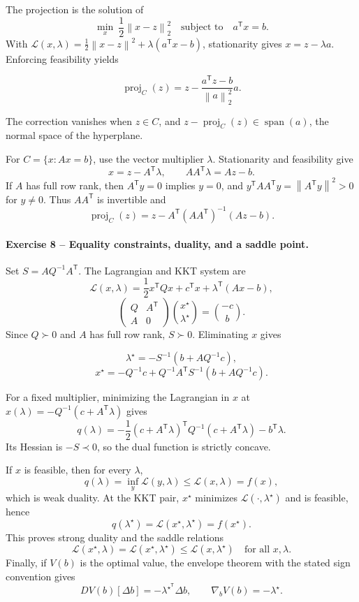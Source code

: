 \documentclass[10pt]{article}
\newcommand{\trans}{^{\mathsf T}}
\newcommand{\norm}[1]{\left\lVert#1\right\rVert}
\newcommand{\proj}{\operatorname{proj}}
\begin{document}
The projection is the solution of
\[
\min_x\ \frac12\norm{x-z}_2^2
\quad\text{subject to}\quad a\trans x=b.
\]
With
\(\mathcal L(x,\lambda)=\frac12\norm{x-z}^2+\lambda(a\trans x-b)\),
stationarity gives \(x=z-\lambda a\). Enforcing feasibility yields
\begin{resultbox}
\[
\proj_C(z)=z-\frac{a\trans z-b}{\norm a_2^2}a.
\]
\end{resultbox}
The correction vanishes when \(z\in C\), and
\(z-\proj_C(z)\in\operatorname{span}(a)\), the normal space of the hyperplane.

For \(C=\{x:Ax=b\}\), use the vector multiplier \(\lambda\). Stationarity and
feasibility give
\[
x=z-A\trans\lambda,
\qquad
AA\trans\lambda=Az-b.
\]
If \(A\) has full row rank, then \(A\trans y=0\) implies \(y=0\), and
\(y\trans AA\trans y=\norm{A\trans y}^2>0\) for \(y\ne0\). Thus \(AA\trans\)
is invertible and
\[
\boxed{\proj_C(z)=z-A\trans(AA\trans)^{-1}(Az-b).}
\]

\paragraph{Exercise 8 -- Equality constraints, duality, and a saddle point.}

Set \(S=AQ^{-1}A\trans\). The Lagrangian and KKT system are
\[
\mathcal L(x,\lambda)
=\frac12x\trans Qx+c\trans x+\lambda\trans(Ax-b),
\]
\[
\begin{pmatrix}Q&A\trans\\A&0\end{pmatrix}
\binom{x^\star}{\lambda^\star}
=\binom{-c}{b}.
\]
Since \(Q\succ0\) and \(A\) has full row rank, \(S\succ0\). Eliminating \(x\)
gives
\begin{resultbox}
\[
\lambda^\star=-S^{-1}(b+AQ^{-1}c),
\]
\[
x^\star=-Q^{-1}c
+Q^{-1}A\trans S^{-1}(b+AQ^{-1}c).
\]
\end{resultbox}

For a fixed multiplier, minimizing the Lagrangian in \(x\) at
\(x(\lambda)=-Q^{-1}(c+A\trans\lambda)\) gives
\[
q(\lambda)
=-\frac12(c+A\trans\lambda)\trans Q^{-1}
  (c+A\trans\lambda)-b\trans\lambda.
\]
Its Hessian is \(-S\prec0\), so the dual function is strictly concave.

If \(x\) is feasible, then for every \(\lambda\),
\[
q(\lambda)=\inf_y\mathcal L(y,\lambda)
\leq\mathcal L(x,\lambda)=f(x),
\]
which is weak duality. At the KKT pair, \(x^\star\) minimizes
\(\mathcal L(\cdot,\lambda^\star)\) and is feasible, hence
\[
q(\lambda^\star)=\mathcal L(x^\star,\lambda^\star)=f(x^\star).
\]
This proves strong duality and the saddle relations
\[
\mathcal L(x^\star,\lambda)
=\mathcal L(x^\star,\lambda^\star)
\leq\mathcal L(x,\lambda^\star)
\quad\text{for all }x,\lambda.
\]
Finally, if \(V(b)\) is the optimal value, the envelope theorem with the
stated sign convention gives
\[
DV(b)[\Delta b]=-\lambda^{\star\trans}\Delta b,
\qquad
\nabla_bV(b)=-\lambda^\star.
\]
\end{document}
